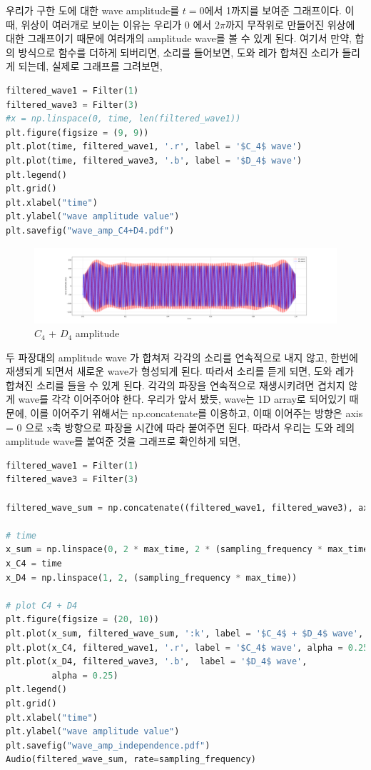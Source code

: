 \documentclass[11pt]{article}
\begin{document}
\pagebreak

우리가 구한 도에 대한 wave amplitude를 $t=0$에서 1까지를 보여준 그래프이다. 이때, 위상이 여러개로 보이는 이유는 우리가 0 에서 $2\pi$까지 무작위로 만들어진 위상에 대한 그래프이기 때문에 여러개의 amplitude wave를 볼 수 있게 된다. 여기서 만약, 합의 방식으로 함수를 더하게 되버리면, 소리를 들어보면, 도와 레가 합쳐진 소리가 들리게 되는데, 실제로 그래프를 그려보면,

\begin{lstlisting}[language=Python]
filtered_wave1 = Filter(1)
filtered_wave3 = Filter(3)
#x = np.linspace(0, time, len(filtered_wave1))
plt.figure(figsize = (9, 9))
plt.plot(time, filtered_wave1, '.r', label = '$C_4$ wave')
plt.plot(time, filtered_wave3, '.b', label = '$D_4$ wave')
plt.legend()
plt.grid()
plt.xlabel("time")
plt.ylabel("wave amplitude value")
plt.savefig("wave_amp_C4+D4.pdf")
\end{lstlisting}

\begin{figure}[!ht]
  \centering
  \includegraphics[width=1\textwidth]{wave_amp_C4+D4.pdf}
  \caption{$C_{4}$ + $D_{4}$ amplitude}
\end{figure}

두 파장대의 amplitude wave 가 합쳐져 각각의 소리를 연속적으로 내지 않고, 한번에 재생되게 되면서 새로운 wave가 형성되게 된다. 따라서 소리를 듣게 되면, 도와 레가 합쳐진 소리를 들을 수 있게 된다. 각각의 파장을 연속적으로 재생시키려면 겹치지 않게 wave를 각각 이어주어야 한다. 우리가 앞서 봤듯, wave는 1D array로 되어있기 때문에, 이를 이어주기 위해서는 np.concatenate를 이용하고, 이때 이어주는 방향은 axis = 0 으로 x축 방향으로 파장을 시간에 따라 붙여주면 된다. 따라서 우리는 도와 레의 amplitude wave를 붙여준 것을 그래프로 확인하게 되면,

\begin{lstlisting}[language=Python]
filtered_wave1 = Filter(1)
filtered_wave3 = Filter(3)

filtered_wave_sum = np.concatenate((filtered_wave1, filtered_wave3), axis = 0)

# time
x_sum = np.linspace(0, 2 * max_time, 2 * (sampling_frequency * max_time + 1) - 1)[:-1]
x_C4 = time
x_D4 = np.linspace(1, 2, (sampling_frequency * max_time))

# plot C4 + D4
plt.figure(figsize = (20, 10))
plt.plot(x_sum, filtered_wave_sum, ':k', label = '$C_4$ + $D_4$ wave', alpha = 0.5) 
plt.plot(x_C4, filtered_wave1, '.r', label = '$C_4$ wave', alpha = 0.25)
plt.plot(x_D4, filtered_wave3, '.b',  label = '$D_4$ wave',
         alpha = 0.25)
plt.legend()
plt.grid()
plt.xlabel("time")
plt.ylabel("wave amplitude value")
plt.savefig("wave_amp_independence.pdf")
Audio(filtered_wave_sum, rate=sampling_frequency)
\end{lstlisting}
\end{document}
